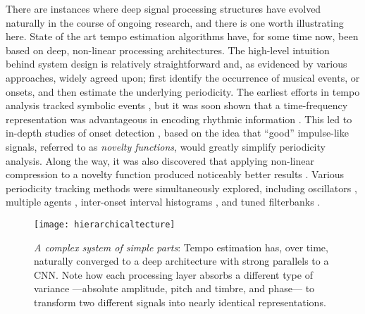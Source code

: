 There are instances where deep signal processing structures have evolved naturally in the course of ongoing research, and there is one worth illustrating here.
State of the art tempo estimation algorithms have, for some time now, been based on deep, non-linear processing architectures.
The high-level intuition behind system design is relatively straightforward and, as evidenced by various approaches, widely agreed upon; first identify the occurrence of musical events, or onsets, and then estimate the underlying periodicity.
The earliest efforts in tempo analysis tracked symbolic events \cite{Dannenberg1984}, but it was soon shown that a time-frequency representation was advantageous in encoding rhythmic information \cite{Scheirer1998}.
This led to in-depth studies of onset detection \cite{Bello2005}, based on the idea that ``good'' impulse-like signals, referred to as \emph{novelty functions}, would greatly simplify periodicity analysis.
Along the way, it was also discovered that applying non-linear compression to a novelty function produced noticeably better results \cite{Klapuri2006}.
Various periodicity tracking methods were simultaneously explored, including oscillators \cite{Large1994}, multiple agents \cite{Goto1995}, inter-onset interval histograms \cite{Dixon2007}, and tuned filterbanks \cite{Grosche2011}.

\begin{figure}
\begin{centering}
\texttt{[image: hierarchicaltecture]}
\caption{\emph{A complex system of simple parts}: Tempo estimation has, over time, naturally converged to a deep architecture with strong parallels to a CNN. Note how each processing layer absorbs a different type of variance ---absolute amplitude, pitch and timbre, and phase--- to transform two different signals into nearly identical representations.}
\label{fig:deeparchs}
\end{centering}
\end{figure}

